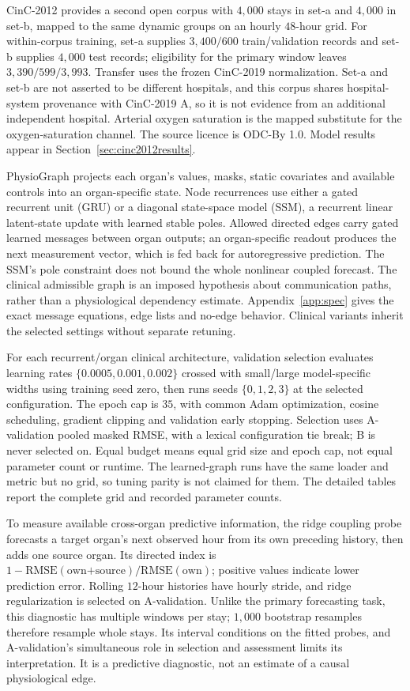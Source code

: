 CinC-2012 provides a second open corpus with $4{,}000$ stays in set-a and $4{,}000$ in set-b, mapped to the same dynamic groups on an hourly $48$-hour grid. For within-corpus training, set-a supplies $3{,}400/600$ train/validation records and set-b supplies $4{,}000$ test records; eligibility for the primary window leaves $3{,}390/599/3{,}993$. Transfer uses the frozen CinC-2019 normalization. Set-a and set-b are not asserted to be different hospitals, and this corpus shares hospital-system provenance with CinC-2019 A, so it is not evidence from an additional independent hospital. Arterial oxygen saturation is the mapped substitute for the oxygen-saturation channel. The source licence is ODC-By 1.0. Model results appear in Section~\ref{sec:cinc2012results}.


PhysioGraph projects each organ's values, masks, static covariates and available controls into an organ-specific state. Node recurrences use either a gated recurrent unit (GRU) or a diagonal state-space model (SSM), a recurrent linear latent-state update with learned stable poles. Allowed directed edges carry gated learned messages between organ outputs; an organ-specific readout produces the next measurement vector, which is fed back for autoregressive prediction. The SSM's pole constraint does not bound the whole nonlinear coupled forecast. The clinical admissible graph is an imposed hypothesis about communication paths, rather than a physiological dependency estimate. Appendix~\ref{app:spec} gives the exact message equations, edge lists and no-edge behavior. Clinical variants inherit the selected settings without separate retuning.


For each recurrent/organ clinical architecture, validation selection evaluates learning rates $\{0.0005,\allowbreak 0.001,\allowbreak 0.002\}$ crossed with small/large model-specific widths using training seed zero, then runs seeds $\{0,1,2,3\}$ at the selected configuration. The epoch cap is $35$, with common Adam optimization, cosine scheduling, gradient clipping and validation early stopping. Selection uses A-validation pooled masked RMSE, with a lexical configuration tie break; B is never selected on. Equal budget means equal grid size and epoch cap, not equal parameter count or runtime. The learned-graph runs have the same loader and metric but no grid, so tuning parity is not claimed for them. The detailed tables report the complete grid and recorded parameter counts.


To measure available cross-organ predictive information, the ridge coupling probe forecasts a target organ's next observed hour from its own preceding history, then adds one source organ. Its directed index is $1-\mathrm{RMSE}(\text{own+source})/\mathrm{RMSE}(\text{own})$; positive values indicate lower prediction error. Rolling $12$-hour histories have hourly stride, and ridge regularization is selected on A-validation. Unlike the primary forecasting task, this diagnostic has multiple windows per stay; $1{,}000$ bootstrap resamples therefore resample whole stays. Its interval conditions on the fitted probes, and A-validation's simultaneous role in selection and assessment limits its interpretation. It is a predictive diagnostic, not an estimate of a causal physiological edge.


